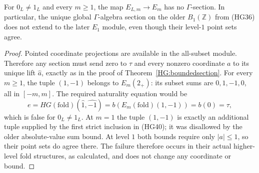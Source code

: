 \begin{proposition}\label{HG:rrsectiondefect}
For $0_L\ne1_L$ and every $m\ge1$, the map
$E_{L,m}\to E_m$ has no $\Gamma$-section.  In particular,
the unique global $\Gamma$-algebra section on the older
$B_1(\mathbb Z)$ from (HG36) does not extend to the later
$E_1$ module, even though their level-$1$ point sets agree.
\end{proposition}
\begin{proof}
Pointed coordinate projections are available in the all-subset
module.  Therefore any section must send zero to $\tau$
and every nonzero coordinate $a$ to its unique lift
$\widehat a$, exactly as in the proof of
Theorem~\ref{HG:boundedsection}.  For every $m\ge1$, the
tuple $(1,-1)$ belongs to $E_m(2_+)$: its subset sums are
$0,1,-1,0$, all in $[-m,m]$.  The required naturality
equation would be
\begin{equation}\tag{HG41}
 e=HG(\mathrm{fold})(\widehat1,\widehat{-1})
       =b(E_m(\mathrm{fold})(1,-1))=b(0)=\tau,
\end{equation}
which is false for $0_L\ne1_L$.  At $m=1$ the tuple
$(1,-1)$ is exactly an additional tuple supplied by the
first strict inclusion in (HG40); it was disallowed by
the older absolute-value sum bound.  At level $1$ both
bounds require only $|a|\le1$, so their point sets do
agree there.  The failure therefore occurs in their
actual higher-level fold structures, as calculated, and
does not change any coordinate or bound.
\end{proof}
